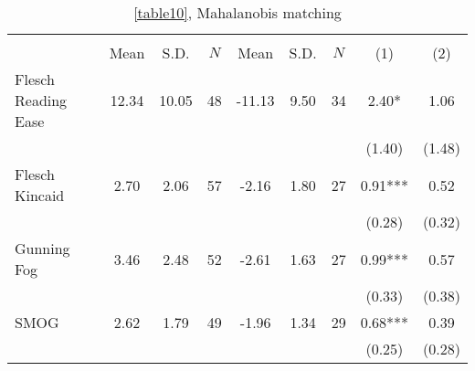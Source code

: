 \begin{table}[H]
    \footnotesize
    \centering
    \begin{threeparttable}
        \caption{\autoref{table10}, Mahalanobis matching}
        \label{table10XA}
        \begin{tabular}{p{3cm}S[table-format=3.3]@{}S[table-format=3.3]@{}S[table-format=3.2]@{}S[table-format=4.3]@{}S[table-format=3.3]@{}S[table-format=3.1]@{}S@{}S@{}}
            \toprule
            &&&\\\cmidrule(lr){2-4}\cmidrule(lr){5-7}\cmidrule(lr){8-9}&{{Mean}}&{{S.D.}}&{{\(N\)}}&{{Mean}}&{{S.D.}}&{{\(N\)}}&{{(1)}}&{{(2)}}\\
            \midrule
            Flesch Reading Ease           &       12.34&       10.05&          48&      -11.13&        9.50&          34&        2.40*  &        1.06   \\
                                          &            &            &            &            &            &            &      (1.40)   &      (1.48)   \\
            Flesch Kincaid                &        2.70&        2.06&          57&       -2.16&        1.80&          27&        0.91***&        0.52   \\
                                          &            &            &            &            &            &            &      (0.28)   &      (0.32)   \\
            Gunning Fog                   &        3.46&        2.48&          52&       -2.61&        1.63&          27&        0.99***&        0.57   \\
                                          &            &            &            &            &            &            &      (0.33)   &      (0.38)   \\
            SMOG                          &        2.62&        1.79&          49&       -1.96&        1.34&          29&        0.68***&        0.39   \\
                                          &            &            &            &            &            &            &      (0.25)   &      (0.28)   \\

\end{tabular}
\end{threeparttable}
\end{table}
